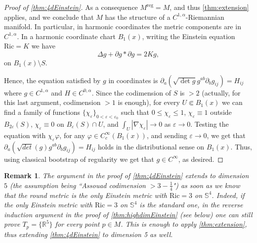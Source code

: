 \documentclass[12pt,a4paper,reqno]{amsart}
\newtheorem{remark}[theorem]{Remark}
\renewcommand{\leq}{\leqslant}
\begin{document}
\begin{proof}[Proof of \cref{thm:4dEinstein}]
    As a consequence $M^{\mathrm{reg}}=M$, and thus \cref{thm:extension} applies, and we conclude that $M$ has the structure of a $C^{1,\alpha}$-Riemannian manifold. In particular, in harmonic coordinates the metric components are in $C^{1,\alpha}$. In a harmonic coordinate chart $B_1(x)$, writing the Einstein equation $\mathrm{Ric}=K$ we have
    \[ \Delta g + \partial g \ast \partial g = 2Kg, \]
    on $B_1(x) \setminus S$. 
    
    Hence, the equation satisfied by $g$ in coordinates is $\partial_a(\sqrt{\det g}g^{ab}\partial_b g_{ij})=H_{ij}$ where $g\in C^{1,\alpha}$ and $H\in C^{0,\alpha}$. Since the codimension of $S$ is $>2$ (actually, for this last argument, codimension $>1$ is enough), for every $U\Subset B_1(x)$ we can find a family of functions $\{\chi_\varepsilon\}_{0<\varepsilon<\varepsilon_0}$ such that $0\leq \chi_\varepsilon\leq 1$, $\chi_\varepsilon\equiv 1$ outside $B_{2\varepsilon}(S)$, $\chi_\varepsilon\equiv 0$ on $B_{\varepsilon}(S)\cap U$, and $\int_U |\nabla\chi_\varepsilon|\to 0$ as $\varepsilon\to 0$. Testing the equation with $\chi_\varepsilon\varphi$, for any $\varphi\in C^\infty_c(B_1(x))$, and sending $\varepsilon\to 0$, we get that $\partial_a(\sqrt{det}(g)g^{ab}\partial_b g_{ij})=H_{ij}$ holds in the distributional sense on $B_1(x)$. Thus, using classical bootstrap of regularity we get that $g\in C^\infty$, as desired.
    
\end{proof}

\begin{remark}\label{rem:ToDim5}
    The argument in the proof of \cref{thm:4dEinstein} extends to dimension $5$ (the assumption being ``Assouad codimension $>3-\frac{1}{4}$") as soon as we know that the round metric is the only Einstein metric with $\mathrm{Ric}=3$ on $\mathbb S^4$. Indeed, if the only Einstein metric with $\mathrm{Ric}=3$ on $\mathbb S^4$ is the standard one, in the reverse induction argument in the proof of \cref{thm:highdimEinstein} (see below) one can still prove $T_p=\{\mathbb R^5\}$ for every point $p\in M$. This is enough to apply \cref{thm:extension}, thus extending \cref{thm:4dEinstein} to dimension 5 as well.
\end{remark}
\end{document}
